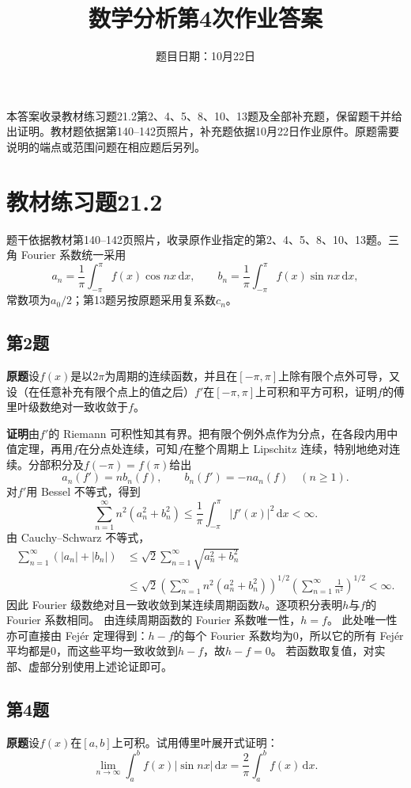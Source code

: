 \documentclass[11pt,a4paper]{ctexart}
\title{数学分析第4次作业答案}
\author{}
\date{题目日期：10月22日}
\newcommand{\dd}{\,\mathrm d}
\newcommand{\proofstart}{\par\noindent\textbf{证明}\quad}
\begin{document}
\maketitle
\vspace{-2em}
本答案收录教材练习题21.2第2、4、5、8、10、13题及全部补充题，保留题干并给出证明。教材题依据第140--142页照片，补充题依据10月22日作业原件。原题需要说明的端点或范围问题在相应题后另列。

\section{教材练习题21.2}
题干依据教材第140--142页照片，收录原作业指定的第2、4、5、8、10、13题。三角 Fourier 系数统一采用
\[
 a_n=\frac1\pi\int_{-\pi}^{\pi}f(x)\cos nx\dd x,\qquad
 b_n=\frac1\pi\int_{-\pi}^{\pi}f(x)\sin nx\dd x,
\]
常数项为$a_0/2$；第13题另按原题采用复系数$c_n$。

\subsection{第2题}
\noindent\textbf{原题}\quad 设$f(x)$是以$2\pi$为周期的连续函数，并且在$[-\pi,\pi]$上除有限个点外可导，又设（在任意补充有限个点上的值之后）$f'$在$[-\pi,\pi]$上可积和平方可积，证明$f$的傅里叶级数绝对一致收敛于$f$。

\proofstart 由$f'$的 Riemann 可积性知其有界。把有限个例外点作为分点，在各段内用中值定理，再用$f$在分点处连续，可知$f$在整个周期上 Lipschitz 连续，特别地绝对连续。分部积分及$f(-\pi)=f(\pi)$给出
\[
 a_n(f')=nb_n(f),\qquad b_n(f')=-na_n(f)\quad(n\ge1).
\]
对$f'$用 Bessel 不等式，得到
\[
 \sum_{n=1}^{\infty}n^2(a_n^2+b_n^2)
 \le\frac1\pi\int_{-\pi}^{\pi}|f'(x)|^2\dd x<\infty.
\]
由 Cauchy--Schwarz 不等式，
\begin{align*}
 \sum_{n=1}^{\infty}(|a_n|+|b_n|)
 &\le\sqrt2\sum_{n=1}^{\infty}\sqrt{a_n^2+b_n^2}\\
 &\le\sqrt2\left(\sum_{n=1}^{\infty}n^2(a_n^2+b_n^2)\right)^{1/2}
 \left(\sum_{n=1}^{\infty}\frac1{n^2}\right)^{1/2}<\infty.
\end{align*}
因此 Fourier 级数绝对且一致收敛到某连续周期函数$h$。逐项积分表明$h$与$f$的 Fourier 系数相同。
由连续周期函数的 Fourier 系数唯一性，$h=f$。
此处唯一性亦可直接由 Fej\'er 定理得到：$h-f$的每个 Fourier 系数均为$0$，所以它的所有 Fej\'er 平均都是$0$，而这些平均一致收敛到$h-f$，故$h-f=0$。
若函数取复值，对实部、虚部分别使用上述论证即可。

\subsection{第4题}
\noindent\textbf{原题}\quad 设$f(x)$在$[a,b]$上可积。试用傅里叶展开式证明：
\[
 \lim_{n\to\infty}\int_a^b f(x)|\sin nx|\dd x
 =\frac2\pi\int_a^b f(x)\dd x.
\]
\end{document}
